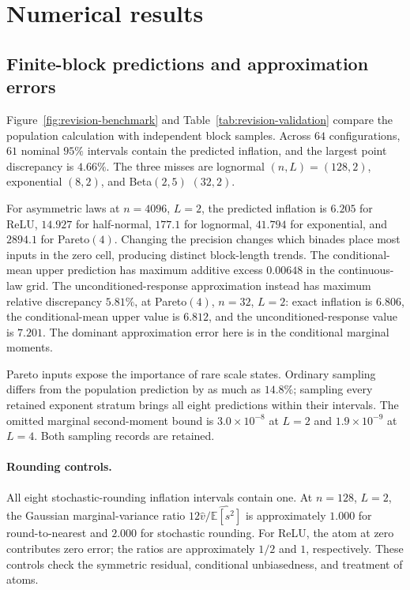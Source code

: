 \section{Numerical results}\label{sec:results}
\subsection{Finite-block predictions and approximation errors}
Figure~\ref{fig:revision-benchmark} and
Table~\ref{tab:revision-validation} compare the population calculation
with independent block samples. Across $64$ configurations, $61$ nominal
$95\%$ intervals contain the predicted inflation, and the largest point
discrepancy is $4.66\%$. The three misses are lognormal $(n,L)=(128,2)$,
exponential $(8,2)$, and Beta$(2,5)$ $(32,2)$.




For asymmetric laws at $n=4096$, $L=2$, the predicted inflation is
$6.205$ for ReLU, $14.927$ for half-normal, $177.1$ for lognormal,
$41.794$ for exponential, and $2894.1$ for Pareto$(4)$.
Changing the precision changes which binades place most inputs in the
zero cell, producing distinct block-length trends.
The conditional-mean upper prediction has maximum additive excess
$0.00648$ in the continuous-law grid. The unconditioned-response
approximation instead has maximum relative discrepancy $5.81\%$,
at Pareto$(4)$, $n=32$, $L=2$: exact inflation is $6.806$, the
conditional-mean upper value is $6.812$, and the unconditioned-response
value is $7.201$. The dominant approximation error here is in the
conditional marginal moments.

Pareto inputs expose the importance of rare scale states. Ordinary
sampling differs from the population prediction by as much as $14.8\%$;
sampling every retained exponent stratum brings all eight predictions
within their intervals. The omitted marginal second-moment bound is
$3.0\times10^{-8}$ at $L=2$ and $1.9\times10^{-9}$ at $L=4$.
Both sampling records are retained.

\paragraph{Rounding controls.}
All eight stochastic-rounding inflation intervals contain one.
At $n=128$, $L=2$, the Gaussian marginal-variance ratio
$12\widehat v/\widehat{\mathbb E[s^2]}$ is approximately $1.000$
for round-to-nearest and $2.000$ for stochastic rounding.
For ReLU, the atom at zero contributes zero error; the ratios are
approximately $1/2$ and $1$, respectively.
These controls check the symmetric residual, conditional unbiasedness,
and treatment of atoms.

